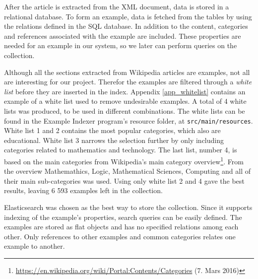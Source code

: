 After the article is extracted from the XML document, data is stored in a relational database. To form an example, data is fetched from the tables by using the relations defined in the SQL database. In addition to the content, categories and references associated with the example are included. These properties are needed for an example in our system, so we later can perform queries on the collection.

Although all the sections extracted from Wikipedia articles are examples, not all are interesting for our project. Therefor the examples are filtered through a \textit{white list} before they are inserted in the index. Appendix \ref{app_whitelist} contains an example of a white list used to remove undesirable examples. A total of 4 white lists was produced, to be used in different combinations. The white lists can be found in the Example Indexer program's resource folder, at \texttt{src/main/resources}. White list 1 and 2 contains the most popular categories, which also are educational. White list 3 narrows the selection further by only including categories related to mathematics and technology. The last list, number 4, is based on the main categories from Wikipedia's main category overview\footnote{\url{https://en.wikipedia.org/wiki/Portal:Contents/Categories} (7. Mars 2016)}. From the overview Mathemathics, Logic, Mathematical Sciences, Computing and all of their main sub-categories was used.
Using only white list 2 and 4 gave the best results, leaving 6 593 examples left in the collection.

Elasticsearch was chosen as the best way to store the collection. Since it supports indexing of the example's properties, search queries can be easily defined. The examples are stored as flat objects and has no specified relations among each other. Only references to other examples and common categories relates one example to another.


